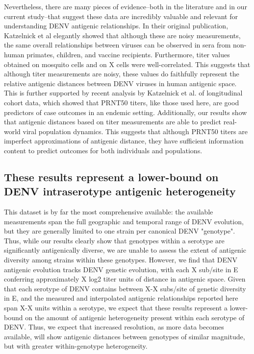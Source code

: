 \documentclass[11pt,oneside,letterpaper]{article}
\begin{document}
Nevertheless, there are many pieces of evidence--both in the literature and in our current study--that suggest these data are incredibly valuable and relevant for understanding DENV antigenic relationships.
In their original publication, Katzelnick et al elegantly showed that although these are noisy measurements, the same overall relationships between viruses can be observed in sera from non-human primates, children, and vaccine recipients.
Furthermore, titer values obtained on mosquito cells and on X cells were well-correlated.
This suggests that although titer measurements are noisy, these values do faithfully represent the relative antigenic distances between DENV viruses in human antigenic space.
This is further supported by recent analysis by Katzelnick et al. of longitudinal cohort data, which showed that PRNT50 titers, like those used here, are good predictors of case outcomes in an endemic setting.
Additionally, our results show that antigenic distances based on titer measurements are able to predict real-world viral population dynamics.
This suggests that although PRNT50 titers are imperfect approximations of antigenic distance, they have sufficient information content to predict outcomes for both individuals and populations.

\subsection*{These results represent a lower-bound on DENV intraserotype antigenic heterogeneity}
This dataset is by far the most comprehensive available: the available measurements span the full geographic and temporal range of DENV evolution, but they are generally limited to one strain per canonical DENV "genotype".
Thus, while our results clearly show that genotypes within a serotype are significantly antigenically diverse, we are unable to assess the extent of antigenic diversity among strains within these genotypes.
However, we find that DENV antigenic evolution tracks DENV genetic evolution, with each X sub/site in E conferring approximately X log2 titer units of distance in antigenic space.
Given that each serotype of DENV contains between X-X subs/site of genetic diversity in E, and the measured and interpolated antigenic relationships reported here span X-X units within a serotype, we expect that these results represent a lower-bound on the amount of antigenic heterogeneity present within each serotype of DENV.
Thus, we expect that increased resolution, as more data becomes available, will show antigenic distances between genotypes of similar magnitude, but with greater within-genotype heterogeneity.
\end{document}
